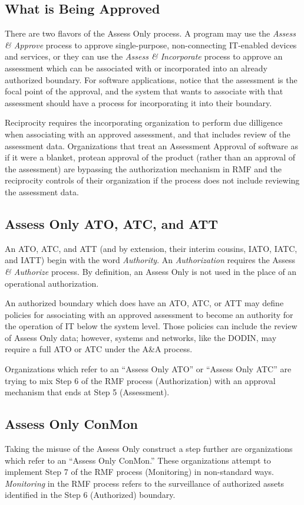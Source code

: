 \subsection{What is Being Approved}
There are two flavors of the Assess Only process. A program may use the \textit{Assess \& Approve} process to approve single-purpose, non-connecting IT-enabled devices and services, or they can use the \textit{Assess \& Incorporate} process to approve an assessment which can be associated with or incorporated into an already authorized boundary.\autocite[\pno~11]{20240212:vaglia2017} For software applications, notice that the assessment is the focal point of the approval, and the system that wants to associate with that assessment should have a process for incorporating it into their boundary.

Reciprocity requires the incorporating organization to perform due dilligence when associating with an approved assessment, and that includes review of the assessment data. Organizations that treat an Assessment Approval of software as if it were a blanket, protean approval of the product (rather than an approval of the assessment) are bypassing the authorization mechanism in RMF and the reciprocity controls of their organization if the process does not include reviewing the assessment data.

\subsection{Assess Only ATO, ATC, and ATT}
An ATO, ATC, and ATT (and by extension, their interim cousins, IATO, IATC, and IATT) begin with the word \textit{Authority}. An \textit{Authorization} requires the Assess \textit{\& Authorize} process. By definition, an Assess Only is not used in the place of an operational authorization.

An authorized boundary which does have an ATO, ATC, or ATT may define policies for associating with an approved assessment to become an authority for the operation of IT below the system level. Those policies can include the review of Assess Only data; however, systems and networks, like the DODIN, may require a full ATO or ATC under the A\&A process.\autocite{20240212:disncpg}

Organizations which refer to an ``Assess Only ATO'' or ``Assess Only ATC'' are trying to mix Step 6 of the RMF process (Authorization) with an approval mechanism that ends at Step 5 (Assessment).

\subsection{Assess Only ConMon}
Taking the misuse of the Assess Only construct a step further are organizations which refer to an ``Assess Only ConMon.'' These organizations attempt to implement Step 7 of the RMF process (Monitoring) in non-standard ways. \textit{Monitoring} in the RMF process refers to the surveillance of authorized assets identified in the Step 6 (Authorized) boundary.\autocite{20240212:nist80037rev2}

